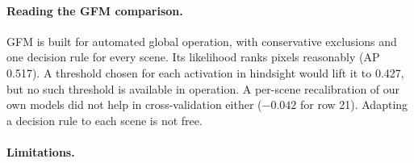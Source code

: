 \documentclass[10pt,twocolumn,a4paper]{article}
\begin{document}
\paragraph{Reading the GFM comparison.} GFM is built for automated global operation, with conservative exclusions
and one decision rule for every scene. Its likelihood ranks pixels reasonably (AP 0.517). A threshold chosen for
each activation in hindsight would lift it to 0.427, but no such threshold is available in operation. A per-scene
recalibration of our own models did not help in cross-validation either ($-0.042$ for row 21). Adapting a decision
rule to each scene is not free.

\paragraph{Limitations.}
\end{document}
